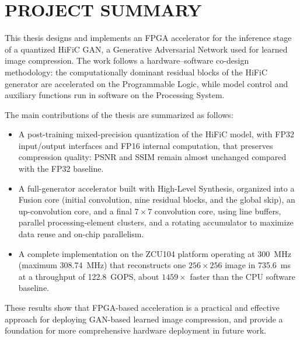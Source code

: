 \section*{PROJECT SUMMARY}

This thesis designs and implements an FPGA accelerator for the inference stage of a quantized HiFiC GAN, a Generative Adversarial Network used for learned image compression. The work follows a hardware--software co-design methodology: the computationally dominant residual blocks of the HiFiC generator are accelerated on the Programmable Logic, while model control and auxiliary functions run in software on the Processing System.

The main contributions of the thesis are summarized as follows:
\begin{itemize}
    \item A post-training mixed-precision quantization of the HiFiC model, with FP32 input/output interfaces and FP16 internal computation, that preserves compression quality: PSNR and SSIM remain almost unchanged compared with the FP32 baseline.
    \item A full-generator accelerator built with High-Level Synthesis, organized into a Fusion core (initial convolution, nine residual blocks, and the global skip), an up-convolution core, and a final $7\times7$ convolution core, using line buffers, parallel processing-element clusters, and a rotating accumulator to maximize data reuse and on-chip parallelism.
    \item A complete implementation on the ZCU104 platform operating at 300~MHz (maximum 308.74~MHz) that reconstructs one $256\times256$ image in 735.6~ms at a throughput of 122.8~GOPS, about $1459\times$ faster than the CPU software baseline.
\end{itemize}

These results show that FPGA-based acceleration is a practical and effective approach for deploying GAN-based learned image compression, and provide a foundation for more comprehensive hardware deployment in future work.

\cleardoublepage
